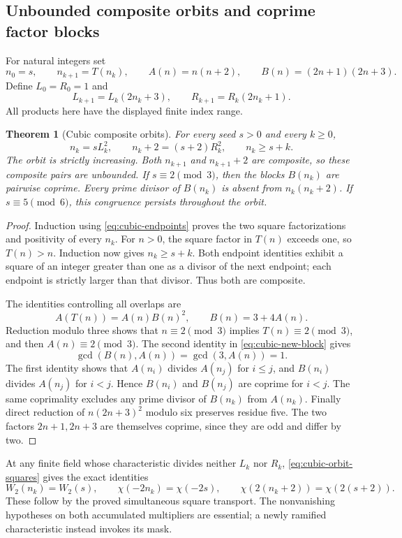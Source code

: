 \documentclass[11pt]{article}
\newtheorem{theorem}{Theorem}[section]
\begin{document}
\subsection{Unbounded composite orbits and coprime factor blocks}

For natural integers set
\[
 n_0=s,\qquad n_{k+1}=T(n_k),\qquad
 A(n)=n(n+2),\qquad B(n)=(2n+1)(2n+3).
\]
Define \(L_0=R_0=1\) and
\[
 L_{k+1}=L_k(2n_k+3),\qquad R_{k+1}=R_k(2n_k+1).
\]
All products here have the displayed finite index range.

\begin{theorem}[Cubic composite orbits]
\label{thm:cubic-composite-orbits}
For every seed \(s>0\) and every \(k\ge0\),
\[
 n_k=sL_k^2,\qquad n_k+2=(s+2)R_k^2,\qquad n_k\ge s+k.
 \tag{C3}\label{eq:cubic-orbit-squares}
\]
The orbit is strictly increasing. Both \(n_{k+1}\) and \(n_{k+1}+2\)
are composite, so these composite pairs are unbounded.
If \(s\equiv2\pmod3\), then the blocks \(B(n_k)\) are pairwise coprime.
Every prime divisor of \(B(n_k)\) is absent from \(n_k(n_k+2)\).
If \(s\equiv5\pmod6\), this congruence persists throughout the orbit.
\end{theorem}
\begin{proof}
Induction using \eqref{eq:cubic-endpoints} proves the two square
factorizations and positivity of every \(n_k\).
For \(n>0\), the square factor in \(T(n)\) exceeds one, so \(T(n)>n\).
Induction now gives \(n_k\ge s+k\).
Both endpoint identities exhibit a square of an integer greater than
one as a divisor of the next endpoint; each endpoint is strictly larger
than that divisor. Thus both are composite.

The identities controlling all overlaps are
\[
 A(T(n))=A(n)B(n)^2,\qquad B(n)=3+4A(n).
 \tag{C4}\label{eq:cubic-new-block}
\]
Reduction modulo three shows that \(n\equiv2\pmod3\) implies
\(T(n)\equiv2\pmod3\), and then \(A(n)\equiv2\pmod3\).
The second identity in \eqref{eq:cubic-new-block} gives
\[
 \gcd(B(n),A(n))=\gcd(3,A(n))=1.
\]
The first identity shows that \(A(n_i)\) divides \(A(n_j)\) for \(i\le j\),
and \(B(n_i)\) divides \(A(n_j)\) for \(i<j\).
Hence \(B(n_i)\) and \(B(n_j)\) are coprime for \(i<j\).
The same coprimality excludes any prime divisor of \(B(n_k)\) from
\(A(n_k)\).
Finally direct reduction of \(n(2n+3)^2\) modulo six preserves residue
five. The two factors \(2n+1,2n+3\) are themselves coprime, since
they are odd and differ by two.
\end{proof}

At any finite field whose characteristic divides neither \(L_k\) nor
\(R_k\), \eqref{eq:cubic-orbit-squares} gives the exact identities
\[
 W_2(n_k)=W_2(s),\qquad
 \chi(-2n_k)=\chi(-2s),\qquad
 \chi(2(n_k+2))=\chi(2(s+2)).
 \tag{C5}\label{eq:cubic-orbit-rows}
\]
These follow by the proved simultaneous square transport.
The nonvanishing hypotheses on both accumulated multipliers are
essential; a newly ramified characteristic instead invokes its mask.
\end{document}
